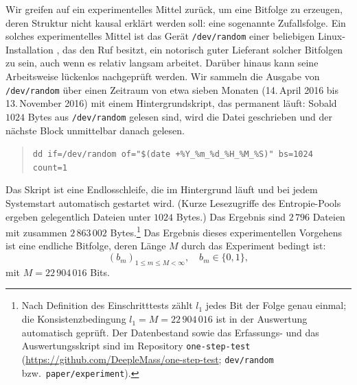 \documentclass[11pt,a4paper]{scrartcl}
\theoremstyle{plain}
\theoremstyle{definition}
\theoremstyle{remark}
\begin{document}
Wir greifen auf ein experimentelles Mittel zurück, um eine Bitfolge zu
erzeugen, deren Struktur nicht kausal erklärt werden soll: eine
sogenannte Zufallsfolge. Ein solches experimentelles Mittel ist das
Gerät \texttt{/dev/random} einer beliebigen Linux-Installation
\cite{gutterman2004}, das den Ruf besitzt, ein notorisch guter
Lieferant solcher Bitfolgen zu sein, auch wenn es relativ langsam
arbeitet. Darüber hinaus kann seine Arbeitsweise lückenlos nachgeprüft
werden. Wir sammeln die Ausgabe von \texttt{/dev/random} über einen
Zeitraum von etwa sieben Monaten (14.\,April 2016 bis
13.\,November 2016) mit einem Hintergrundskript, das permanent läuft:
Sobald $1024$ Bytes aus \texttt{/dev/random} gelesen sind, wird die
Datei geschrieben und der nächste Block unmittelbar danach gelesen.
\begin{quote}
\verb|dd if=/dev/random of="$(date +%Y_%m_%d_%H_%M_%S)" bs=1024 count=1|
\end{quote}
Das Skript ist eine Endlosschleife, die im Hintergrund läuft und bei
jedem Systemstart automatisch gestartet wird. (Kurze Lesezugriffe des
Entropie-Pools ergeben gelegentlich Dateien unter $1024$ Bytes.) Das Ergebnis sind $2\,796$ Dateien mit zusammen
$2\,863\,002$ Bytes.\footnote{Nach Definition des Einschritttests
zählt $l_1$ jedes Bit der Folge genau einmal; die
Konsistenzbedingung $l_1=M=22\,904\,016$ ist in der Auswertung
automatisch geprüft. Der Datenbestand sowie das Erfassungs- und das
Auswertungsskript sind im Repository \texttt{one-step-test}
(\url{https://github.com/DeepleMass/one-step-test}; \texttt{dev/random}
bzw.\ \texttt{paper/experiment}).}
Das Ergebnis dieses experimentellen Vorgehens ist eine endliche
Bitfolge, deren Länge $M$ durch das Experiment bedingt ist:
\begin{equation}\label{eqn:bitfolgebeliebigerlaenge}
  (b_m)_{1\leq m\leq M<\infty},\quad b_m\in\{0,1\},
\end{equation}
mit $M=22\,904\,016$ Bits.
\end{document}
